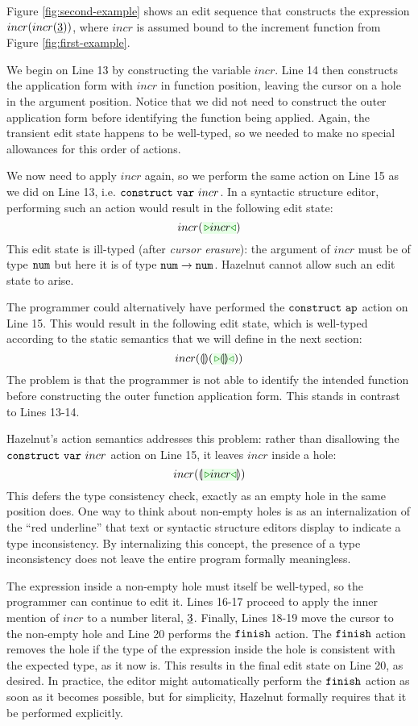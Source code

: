 Figure \ref{fig:second-example} shows an edit sequence that constructs the expression $incr(incr(\underline{3}))$, where $incr$ is assumed bound to the increment function from Figure \ref{fig:first-example}.

We begin on Line 13 by constructing the variable $incr$. Line 14 then constructs the application form with $incr$ in function position, leaving the cursor on a hole in the argument position. Notice that we did not need to construct the outer application form before identifying the function being applied. Again, the transient edit state happens to be well-typed, so we needed to make no special allowances for this order of actions.

We now need to apply $incr$ again, so we perform the same action on Line 15 as we did on Line 13, i.e. $\mathtt{construct}~\mathtt{var}~incr$. In a syntactic structure editor, performing such an action would result in the following edit state: 
\[
incr(\zwsel{incr})
\]
This edit state is ill-typed (after \emph{cursor erasure}): the argument of $incr$ must be of type $\texttt{num}$ but here it is of type $\texttt{num} \rightarrow \texttt{num}$. Hazelnut cannot allow such an edit state to arise. 

The programmer could alternatively have performed the $\mathtt{construct}~\mathtt{ap}$ action on Line 15. This would result in the following edit state, which is well-typed according to the static semantics that we will define in the next section:
\[
incr(\hhole{}(\zwsel{\hhole{}}))
\]
The problem is that the programmer is not able to identify the intended function before constructing the outer function application form. This stands in contrast to Lines 13-14. %

Hazelnut's action semantics addresses this problem: rather than disallowing the $\mathtt{construct}~\mathtt{var}~incr$ action on Line 15, it leaves $incr$ inside a hole:
\[
incr(\hhole{\zwsel{incr}})
\]
This defers the type consistency check, exactly as an empty hole in the same position does. One way to think about non-empty holes is as an internalization of the ``red underline'' that text or syntactic structure editors display to indicate a type inconsistency. By internalizing this concept, the presence of a type inconsistency does not leave the entire program formally meaningless.

The expression inside a non-empty hole must itself be well-typed, so the programmer can continue to edit it. Lines 16-17 proceed to apply the inner mention of $incr$ to a number literal, $\underline{3}$. Finally, Lines 18-19 move the cursor to the non-empty hole and Line 20 performs the $\mathtt{finish}$ action. The $\mathtt{finish}$ action removes the hole if the type of the expression inside the hole is consistent with the expected type, as it now is. This results in the final edit state on Line 20, as desired. In practice, the editor might automatically perform the $\mathtt{finish}$ action as soon as it becomes possible, but for simplicity, Hazelnut formally requires that it be performed explicitly.


